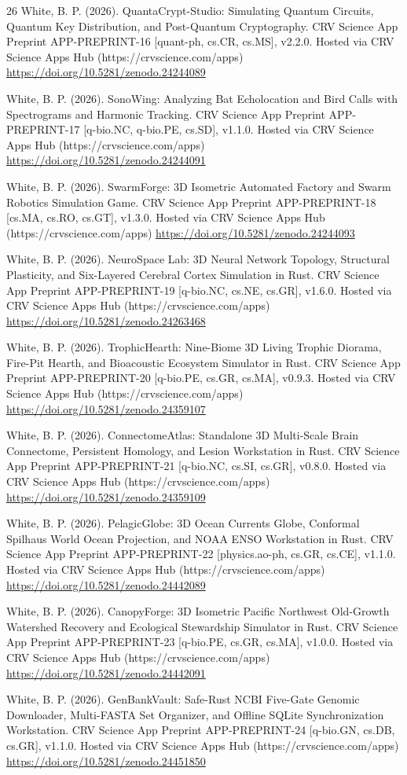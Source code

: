 \documentclass[10pt,letterpaper]{article}
\begin{document}
\begin{thebibliography}{26}
 White, B. P. (2026). QuantaCrypt-Studio: Simulating Quantum Circuits, Quantum Key Distribution, and Post-Quantum Cryptography. CRV Science App Preprint APP-PREPRINT-16 [quant-ph, cs.CR, cs.MS], v2.2.0. Hosted via CRV Science Apps Hub (https://crvscience.com/apps) \url{https://doi.org/10.5281/zenodo.24244089}

 White, B. P. (2026). SonoWing: Analyzing Bat Echolocation and Bird Calls with Spectrograms and Harmonic Tracking. CRV Science App Preprint APP-PREPRINT-17 [q-bio.NC, q-bio.PE, cs.SD], v1.1.0. Hosted via CRV Science Apps Hub (https://crvscience.com/apps) \url{https://doi.org/10.5281/zenodo.24244091}

 White, B. P. (2026). SwarmForge: 3D Isometric Automated Factory and Swarm Robotics Simulation Game. CRV Science App Preprint APP-PREPRINT-18 [cs.MA, cs.RO, cs.GT], v1.3.0. Hosted via CRV Science Apps Hub (https://crvscience.com/apps) \url{https://doi.org/10.5281/zenodo.24244093}

 White, B. P. (2026). NeuroSpace Lab: 3D Neural Network Topology, Structural Plasticity, and Six-Layered Cerebral Cortex Simulation in Rust. CRV Science App Preprint APP-PREPRINT-19 [q-bio.NC, cs.NE, cs.GR], v1.6.0. Hosted via CRV Science Apps Hub (https://crvscience.com/apps) \url{https://doi.org/10.5281/zenodo.24263468}

 White, B. P. (2026). TrophicHearth: Nine-Biome 3D Living Trophic Diorama, Fire-Pit Hearth, and Bioacoustic Ecosystem Simulator in Rust. CRV Science App Preprint APP-PREPRINT-20 [q-bio.PE, cs.GR, cs.MA], v0.9.3. Hosted via CRV Science Apps Hub (https://crvscience.com/apps) \url{https://doi.org/10.5281/zenodo.24359107}

 White, B. P. (2026). ConnectomeAtlas: Standalone 3D Multi-Scale Brain Connectome, Persistent Homology, and Lesion Workstation in Rust. CRV Science App Preprint APP-PREPRINT-21 [q-bio.NC, cs.SI, cs.GR], v0.8.0. Hosted via CRV Science Apps Hub (https://crvscience.com/apps) \url{https://doi.org/10.5281/zenodo.24359109}

 White, B. P. (2026). PelagicGlobe: 3D Ocean Currents Globe, Conformal Spilhaus World Ocean Projection, and NOAA ENSO Workstation in Rust. CRV Science App Preprint APP-PREPRINT-22 [physics.ao-ph, cs.GR, cs.CE], v1.1.0. Hosted via CRV Science Apps Hub (https://crvscience.com/apps) \url{https://doi.org/10.5281/zenodo.24442089}

 White, B. P. (2026). CanopyForge: 3D Isometric Pacific Northwest Old-Growth Watershed Recovery and Ecological Stewardship Simulator in Rust. CRV Science App Preprint APP-PREPRINT-23 [q-bio.PE, cs.GR, cs.MA], v1.0.0. Hosted via CRV Science Apps Hub (https://crvscience.com/apps) \url{https://doi.org/10.5281/zenodo.24442091}

 White, B. P. (2026). GenBankVault: Safe-Rust NCBI Five-Gate Genomic Downloader, Multi-FASTA Set Organizer, and Offline SQLite Synchronization Workstation. CRV Science App Preprint APP-PREPRINT-24 [q-bio.GN, cs.DB, cs.GR], v1.1.0. Hosted via CRV Science Apps Hub (https://crvscience.com/apps) \url{https://doi.org/10.5281/zenodo.24451850}
\end{thebibliography}
\end{document}
